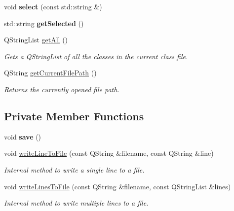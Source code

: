 \begin{DoxyCompactItemize}
void {\bfseries select} (const std\+::string \&)
\item 
\mbox{\label{classClassModel_a935b07226c750dad2410d22fa516db1f}} 
std\+::string {\bfseries get\+Selected} ()
\item 
\mbox{\label{classClassModel_a0a2c7f3e06cb56c9f3df36c3e8e48031}} 
Q\+String\+List \hyperlink{classClassModel_a0a2c7f3e06cb56c9f3df36c3e8e48031}{get\+All} ()
\begin{DoxyCompactList}\small\item\em Gets a Q\+String\+List of all the classes in the current class file. \end{DoxyCompactList}\item 
\mbox{\label{classClassModel_aa952e5109a5246d443f7e83f8a7d75ac}} 
Q\+String \hyperlink{classClassModel_aa952e5109a5246d443f7e83f8a7d75ac}{get\+Current\+File\+Path} ()
\begin{DoxyCompactList}\small\item\em Returns the currently opened file path. \end{DoxyCompactList}\end{DoxyCompactItemize}
\subsection*{Private Member Functions}
\begin{DoxyCompactItemize}
\item 
\mbox{\label{classClassModel_ab229a1a8dacc1a892d3757965d6f1e3a}} 
void {\bfseries save} ()
\item 
void \hyperlink{classClassModel_a4ef5baaf966305d2ebb44bf2c40ee533}{write\+Line\+To\+File} (const Q\+String \&filename, const Q\+String \&line)
\begin{DoxyCompactList}\small\item\em Internal method to write a single line to a file. \end{DoxyCompactList}\item 
void \hyperlink{classClassModel_af78dad5b5b8f214b5067fd1dd629b594}{write\+Lines\+To\+File} (const Q\+String \&filename, const Q\+String\+List \&lines)
\begin{DoxyCompactList}\small\item\em Internal method to write multiple lines to a file. \end{DoxyCompactList}\end{DoxyCompactItemize}
